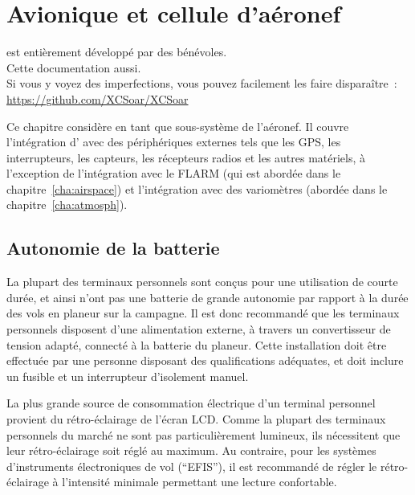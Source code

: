
\chapter{Avionique et cellule d'aéronef}\label{cha:avionics-airframe}

\begin{framed}
	\begin{center}
		\xc{} est entièrement développé par des bénévoles.\\
		Cette documentation aussi.\\
		Si vous y voyez des imperfections, vous pouvez facilement les faire disparaître~:\\
		\url{https://github.com/XCSoar/XCSoar}
	\end{center}
\end{framed}

Ce chapitre considère \xc{} en tant que sous-système de l'aéronef.
Il couvre l'intégration d'\xc{} avec des périphériques externes tels que les GPS, les interrupteurs, les capteurs, les récepteurs radios et les autres matériels, à l'exception de l'intégration avec le FLARM (qui est abordée dans le chapitre~\ref{cha:airspace}) et l'intégration avec des variomètres (abordée dans le chapitre~\ref{cha:atmosph}).

\section{Autonomie de la batterie}

La plupart des terminaux personnels sont conçus pour une utilisation de courte durée, et ainsi n'ont pas une batterie de grande autonomie par rapport à la durée des vols en planeur sur la campagne.
Il est donc recommandé que les terminaux personnels disposent d'une alimentation externe, à travers un convertisseur de tension adapté, connecté à la batterie du planeur.
Cette installation doit être effectuée par une personne disposant des qualifications adéquates, et doit inclure un fusible et un interrupteur d'isolement manuel.

La plus grande source de consommation électrique d'un terminal personnel provient du rétro-éclairage de l'écran LCD.
Comme la plupart des terminaux personnels du marché ne sont pas particulièrement lumineux, ils nécessitent que leur rétro-éclairage soit réglé au maximum.
Au contraire, pour les systèmes d'instruments électroniques de vol (``EFIS''), il est recommandé de régler le rétro-éclairage à l'intensité minimale permettant une lecture confortable.


